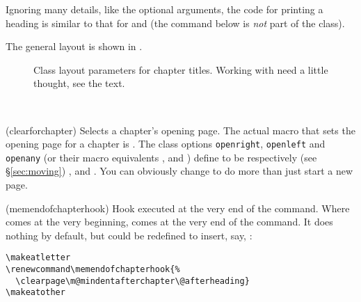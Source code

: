 Ignoring many details, like the optional arguments, the code for
printing a \cmd{\chapter} heading is similar to that for \cmd{\book}
and \cmd{\part} (the  command below is \emph{not}
part of the class).
\begin{lcode}
\newcommand{\chapterhead}[1]{ %
  \clearforchapter        %
  \thispagestyle{chapter} %
  \insertchapterspace     %
  \chapterheadstart       %
  \printchaptername\chapternamenum\printchapternum
  \afterchapternum        %
  \printchaptertitle{#1}  %
  \afterchaptertitle}     %
\end{lcode}
The general layout is shown in .

\begin{figure}
\centering
\chapterdiagram
\caption{Class layout parameters for chapter titles. Working with
   need a little thought, see the text.}
\label{lay:chap}
\end{figure}

\begin{syntax}
\cmd{\clearforchapter} \\
\end{syntax}
\glossary(clearforchapter)%
  {}%
  {Selects a chapter's opening page.}
The actual macro that sets the opening page for a chapter is
\cmd{\clearforchapter}. The class options \texttt{openright},
\texttt{openleft} and \texttt{openany} (or their macro equivalents
\cmd{\openright}, \cmd{\openleft} and
\cmd{\openany}) define \cmd{\clearforchapter} to be respectively
(see \S\ref{sec:moving})
\cmd{\cleartorecto}, \cmd{\cleartoverso} and \cmd{\clearpage}. You can
obviously change \cmd{\clearforchapter} to do more than just start a
new page.

\begin{syntax}
\cmd{\memendofchapterhook}
\end{syntax}
\glossary(memendofchapterhook)%
  {}%
  {Hook executed at the very end of the  command.}
Where \cmd{\clearforchapter} comes at the very beginning,
\cmd{\memendofchapterhook} comes at the very end of the \cmd{\chapter}
command. It does nothing by default, but could be redefined to insert,
say, \cmd{\clearpage}:
\begin{verbatim}
\makeatletter
\renewcommand\memendofchapterhook{%
  \clearpage\m@mindentafterchapter\@afterheading}
\makeatother
\end{verbatim}


